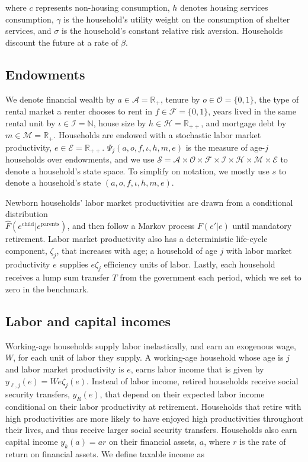 \documentclass[parskip=full]{article}
\begin{document}
\noindent where $c$ represents non-housing consumption, $h$ denotes housing services consumption, $\gamma$ is the household's utility weight on the consumption of shelter services, and $\sigma$ is the household's constant relative risk aversion. Households discount the future at a rate of $\beta$. %

\subsection{Endowments}

We denote financial wealth by $a\in \mathcal{A}=\mathbb{R}_+$, tenure by $o \in \mathcal{O}=\{0,1\}$, the type of rental market a renter chooses to rent in $f \in \mathcal{F}=\{0,1\}$, years lived in the same rental unit by $\iota \in \mathcal{I}=\mathbb{N}$, house size by $h\in \mathcal{H}=\mathbb{R}_{++}$, and mortgage debt by $m\in \mathcal{M}=\mathbb{R}_+$. Households are endowed with a stochastic labor market productivity, $e \in\mathcal{E} = \mathbb{R}_{++}$. $\Psi_{j}(a,o,f,\iota,h,m,e)$ is the measure of age-$j$ households over endowments, and we use $\mathcal{S}=\mathcal{A}\times\mathcal{O}\times\mathcal{F}\times\mathcal{I}\times\mathcal{H}\times\mathcal{M}\times\mathcal{E}$ to denote a household's state space. To simplify on notation, we mostly use $s$ to denote a household's state $(a,o,f,\iota,h,m,e)$.

Newborn households' labor market productivities are drawn from a conditional distribution \\ $\hat{F}(e^{\mbox{child}}|e^{\mbox{parents}})$, and then follow a Markov process $F(e'|e)$ until mandatory retirement. Labor market productivity also has a deterministic life-cycle component, $\zeta_j$, that increases with age; a household of age $j$ with labor market productivity $e$ supplies $e\zeta_j$ efficiency units of labor. Lastly, each household receives a lump sum transfer $T$ from the government each period, which we set to zero in the benchmark.

\subsection{Labor and capital incomes}\label{subsection:income}

Working-age households supply labor inelastically, and earn an exogenous wage, $W$, for each unit of labor they supply. A working-age household whose age is $j$ and labor market productivity is $e$, earns labor income that is given by $y_{\ell,j}(e)=We\zeta_j(e)$. Instead of labor income, retired households receive social security transfers, $y_{R}(e)$, that depend on their expected labor income conditional on their labor productivity at retirement. Households that retire with high productivities are more likely to have enjoyed high productivities throughout their lives, and thus receive larger social security transfers. Households also earn capital income $y_{k}(a)=ar$ on their financial assets, $a$, where $r$ is the rate of return on financial assets. We define taxable income as
\end{document}
